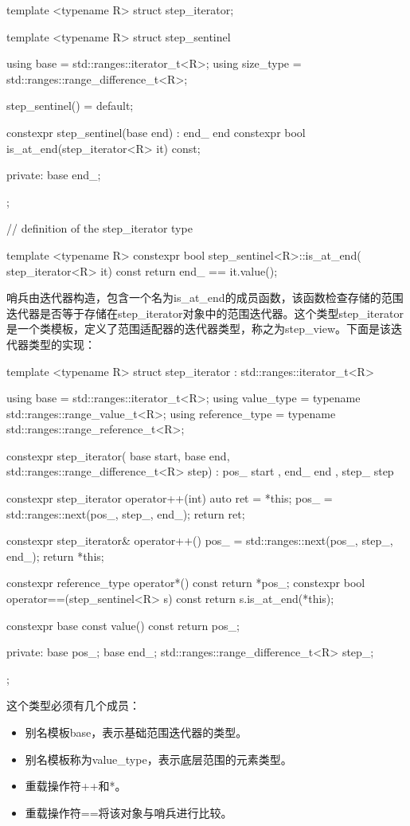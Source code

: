 \begin{cpp}
template <typename R>
struct step_iterator;

template <typename R>
struct step_sentinel
{
	using base = std::ranges::iterator_t<R>;
	using size_type = std::ranges::range_difference_t<R>;
	
	step_sentinel() = default;
	
	constexpr step_sentinel(base end) : end_{ end } {}
	constexpr bool is_at_end(step_iterator<R> it) const;
	
private:
	base end_;
};

// definition of the step_iterator type

template <typename R>
constexpr bool step_sentinel<R>::is_at_end(
	step_iterator<R> it) const
{
	return end_ == it.value();
}
\end{cpp}

哨兵由迭代器构造，包含一个名为is\_at\_end的成员函数，该函数检查存储的范围迭代器是否等于存储在step\_iterator对象中的范围迭代器。这个类型step\_iterator是一个类模板，定义了范围适配器的迭代器类型，称之为step\_view。下面是该迭代器类型的实现：

\begin{cpp}
template <typename R>
struct step_iterator : std::ranges::iterator_t<R>
{
	using base
		= std::ranges::iterator_t<R>;
	using value_type
		= typename std::ranges::range_value_t<R>;
	using reference_type
		= typename std::ranges::range_reference_t<R>;
		
	constexpr step_iterator(
		base start, base end,
		std::ranges::range_difference_t<R> step) :
		pos_{ start }, end_{ end }, step_{ step }
	{
	}

	constexpr step_iterator operator++(int)
	{
		auto ret = *this;
		pos_ = std::ranges::next(pos_, step_, end_);
		return ret;
	}

	constexpr step_iterator& operator++()
	{
		pos_ = std::ranges::next(pos_, step_, end_);
		return *this;
	}

	constexpr reference_type operator*() const
	{
		return *pos_;
	}
	constexpr bool operator==(step_sentinel<R> s) const
	{
		return s.is_at_end(*this);
	}

	constexpr base const value() const { return pos_; }
	
private:
	base pos_;
	base end_;
	std::ranges::range_difference_t<R> step_;
};
\end{cpp}

这个类型必须有几个成员：

\begin{itemize}
\item
别名模板base，表示基础范围迭代器的类型。

\item
别名模板称为value\_type，表示底层范围的元素类型。

\item
重载操作符++和*。

\item
重载操作符==将该对象与哨兵进行比较。
\end{itemize}

